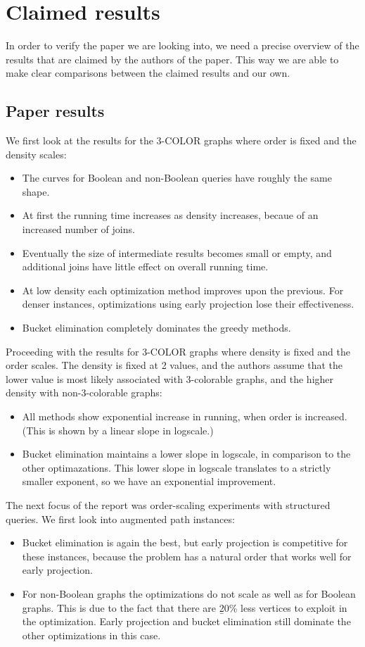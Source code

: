 \section{Claimed results}
In order to verify the paper we are looking into, we need a precise overview of the results that are claimed by the authors of the paper. This way we are able to make clear comparisons between the claimed results and our own.

\subsection{Paper results}
We first look at the results for the 3-COLOR graphs where order is fixed and the density scales:
\begin{itemize}
	\item The curves for Boolean and non-Boolean queries have roughly the same shape.
	\item At first the running time increases as density increases, becaue of an increased number of joins.
	\item Eventually the size of intermediate results becomes small or empty, and additional joins have little effect on overall running time.
	\item At low density each optimization method improves upon the previous. For denser instances, optimizations using early projection lose their effectiveness.
	\item Bucket elimination completely dominates the greedy methods.
\end{itemize}

\noindent Proceeding with the results for 3-COLOR graphs where density is fixed and the order scales. The density is fixed at 2 values, and the authors assume that the lower value is most likely associated with 3-colorable graphs, and the higher density with non-3-colorable graphs:
\begin{itemize}
	\item All methods show exponential increase in running, when order is increased. (This is shown by a linear slope in logscale.)
	\item Bucket elimination maintains a lower slope in logscale, in comparison to the other optimazations. This lower slope in logscale translates to a strictly smaller exponent, so we have an exponential improvement.
\end{itemize}

\noindent The next focus of the report was order-scaling experiments with structured queries. We first look into augmented path instances:
\begin{itemize}
	\item Bucket elimination is again the best, but early projection is competitive for these instances, because the problem has a natural order that works well for early projection.
	\item For non-Boolean graphs the optimizations do not scale as well as for Boolean graphs. This is due to the fact that there are {\b 20\% less vertices to exploit in the optimization}. Early projection and bucket elimination still dominate the other optimizations in this case.
\end{itemize}

